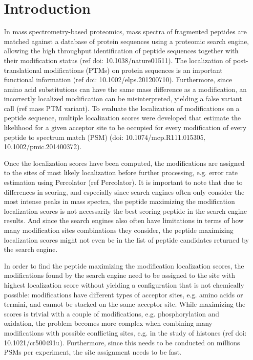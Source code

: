 \documentclass{bioinfo}
\begin{document}
\section{Introduction}

In mass spectrometry-based proteomics, mass spectra of fragmented peptides are matched against a database of protein sequences using a proteomic search engine, allowing the high throughput identification of peptide sequences together with their modification status (ref doi: 10.1038/nature01511). The localization of post-translational modifications (PTMs) on protein sequences is an important functional information (ref doi: 10.1002/elps.201200710). Furthermore, since amino acid substitutions can have the same mass difference as a modification, an incorrectly localized modification can be misinterpreted, yielding a false variant call (ref mass PTM variant). To evaluate the localization of modifications on a peptide sequence, multiple localization scores were developed that estimate the likelihood for a given acceptor site to be occupied for every modification of every peptide to spectrum match (PSM) (doi: 10.1074/mcp.R111.015305, 10.1002/pmic.201400372). 

Once the localization scores have been computed, the modifications are assigned to the sites of most likely localization before further processing, e.g. error rate estimation using Percolator (ref Percolator). It is important to note that due to differences in scoring, and especially since search engines often only consider the most intense peaks in mass spectra, the peptide maximizing the modification localization scores is not necessarily the best scoring peptide in the search engine results. And since the search engines also often have limitations in terms of how many modification sites combinations they consider, the peptide maximizing localization scores might not even be in the list of peptide candidates returned by the search engine.

In order to find the peptide maximizing the modification localization scores, the modifications found by the search engine need to be assigned to the site with highest localization score without yielding a configuration that is not chemically possible: modifications have different types of acceptor sites, e.g. amino acids or termini, and cannot be stacked on the same acceptor site. While maximizing the scores is trivial with a couple of modifications, e.g. phosphorylation and oxidation, the problem becomes more complex when combining many modifications with possible conflicting sites, e.g. in the study of histones (ref doi: 10.1021/cr500491u). Furthermore, since this needs to be conducted on millions PSMs per experiment, the site assignment needs to be fast.
\end{document}
